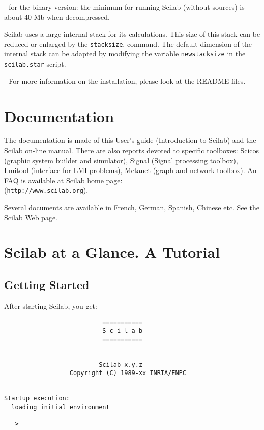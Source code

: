 - for the binary version: the minimum for running Scilab (without
sources) is about 40 Mb when decompressed.

\label{stks}
Scilab uses a large internal stack for its calculations. This size
of this stack can be reduced or enlarged by the 
{\tt stacksize}.
command. The default dimension of the internal stack can be adapted
by modifying the variable {\tt newstacksize} in the {\tt scilab.star}
script.

- For more information on the installation, please look at the README files.

\section{Documentation}

The documentation is made of this User's guide (Introduction to
Scilab) and the Scilab on-line manual. There are also
reports devoted to specific toolboxes: Scicos (graphic system builder
and simulator), Signal (Signal processing toolbox), Lmitool (interface for 
LMI problems), Metanet (graph and network toolbox). An FAQ is
available at Scilab home page:\\
(\verb!http://www.scilab.org!).

Several documents are available in French, German, Spanish, Chinese etc. 
See the Scilab Web page.

\section{Scilab at a Glance. A Tutorial}

\subsection{Getting Started}

After starting Scilab, you get:

\bigskip

\begin{verbatim}
                           ===========
                           S c i l a b
                           ===========
 
 
                          Scilab-x.y.z
                  Copyright (C) 1989-xx INRIA/ENPC 
 
 
Startup execution:
  loading initial environment
   
 -->

\end{verbatim}



